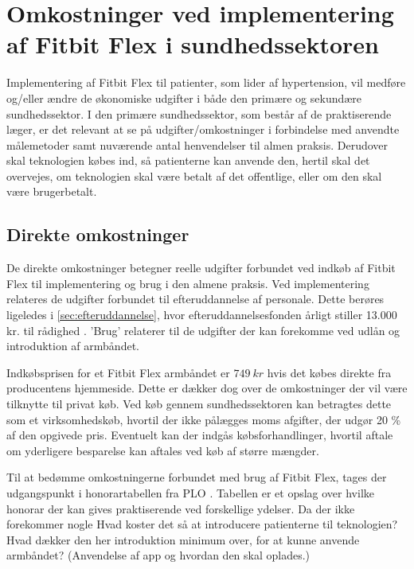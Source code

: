 
\section{Omkostninger ved implementering af Fitbit Flex i sundhedssektoren}

Implementering af Fitbit Flex til patienter, som lider af hypertension, vil medføre og/eller ændre de økonomiske udgifter i både den primære og sekundære sundhedssektor. I den primære sundhedssektor, som består af de praktiserende læger, er det relevant at se på udgifter/omkostninger i forbindelse med anvendte målemetoder samt nuværende antal henvendelser til almen praksis. Derudover skal teknologien købes ind, så patienterne kan anvende den, hertil skal det overvejes, om teknologien skal være betalt af det offentlige, eller om den skal være brugerbetalt.


\subsection{Direkte omkostninger}
De direkte omkostninger betegner reelle udgifter forbundet ved indkøb af Fitbit Flex til implementering og brug i den almene praksis.  
Ved implementering relateres de udgifter forbundet til efteruddannelse af personale. Dette berøres ligeledes i \autoref{sec:efteruddannelse}, hvor efteruddannelsesfonden årligt stiller 13.000 kr. til rådighed \citep{vedsted2005}.  
'Brug' relaterer til de udgifter der kan forekomme ved udlån og introduktion af armbåndet. 

Indkøbsprisen for et Fitbit Flex armbåndet er $749\ kr$ hvis det købes direkte fra producentens hjemmeside. Dette er dækker dog over de omkostninger der vil være tilknytte til privat køb. 
Ved køb gennem sundhedssektoren kan betragtes dette som et virksomhedskøb, hvortil der ikke pålægges moms afgifter, der udgør 20 \% af den opgivede pris. 
Eventuelt kan der indgås købsforhandlinger, hvortil aftale om yderligere besparelse kan aftales ved køb af større mængder. 

 

Til at bedømme omkostningerne forbundet med brug af Fitbit Flex, tages der udgangspunkt i honorartabellen fra PLO \citep{honorartabel2016}. Tabellen er et opslag over hvilke honorar der kan gives praktiserende ved forskellige ydelser.
Da der ikke forekommer nogle 
Hvad koster det så at introducere patienterne til teknologien? 
	Hvad dækker den her introduktion minimum over, for at kunne anvende armbåndet? (Anvendelse af app og hvordan den skal oplades.)
	
